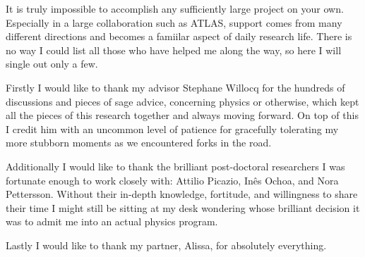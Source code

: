 
\begin{acknowledgements}      

It is truly impossible to accomplish any sufficiently large project on your own. Especially in a large collaboration such as ATLAS, support comes from many different directions and becomes a famiilar aspect of daily research life. There is no way I could list all those who have helped me along the way, so here I will single out only a few.

Firstly I would like to thank my advisor Stephane Willocq for the hundreds of discussions and pieces of sage advice, concerning physics or otherwise, which kept all the pieces of this research together and always moving forward. On top of this I credit him with an uncommon level of patience for gracefully tolerating my more stubborn moments as we encountered forks in the road.

Additionally I would like to thank the brilliant post-doctoral researchers I was fortunate enough to work closely with: Attilio Picazio, Inês Ochoa, and Nora Pettersson. Without their in-depth knowledge, fortitude, and willingness to share their time I might still be sitting at my desk wondering whose brilliant decision it was to admit me into an actual physics program.

Lastly I would like to thank my partner, Alissa, for absolutely everything.

\end{acknowledgements}
